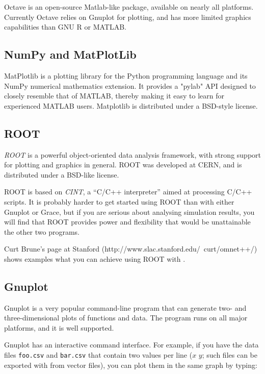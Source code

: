 Octave is an open-source Matlab-like package, available on nearly all platforms.
Currently Octave relies on Gnuplot for plotting, and has more limited
graphics capabilities than GNU R or MATLAB.

\subsection{NumPy and MatPlotLib}

MatPlotlib is a plotting library for the Python programming language and
its NumPy numerical mathematics extension. It provides a "pylab" API designed
to closely resemble that of MATLAB, thereby making it easy to learn
for experienced MATLAB users. Matplotlib is distributed under a BSD-style
license.


\subsection{ROOT}

\textit{ROOT} is a powerful object-oriented data analysis framework,
with strong support for plotting and graphics in general.
ROOT was developed at CERN, and is distributed under a BSD-like license.

ROOT is based on \textit{CINT}, a ``C/C++ interpreter''
aimed at processing C/C++ scripts. It is probably harder to get started
using ROOT than with either Gnuplot or Grace, but if you are serious
about analysing simulation results, you will find that ROOT provides
power and flexibility that would be unattainable the other two programs.

Curt Brune's page at Stanford (http://www.slac.stanford.edu/~curt/omnet++/)
shows examples what you can achieve using ROOT with {\opp}.


\subsection{Gnuplot}
\label{sec:ana-sim:gnuplot}

Gnuplot is a very popular command-line program that can generate two-
and three-dimensional plots of functions and data. The program runs
on all major platforms, and it is well supported.

Gnuplot has an interactive command interface. For example, if you have
the data files \texttt{foo.csv} and \texttt{bar.csv} that contain
two values per line ($x$ $y$; such files can be exported with
 from vector files), you can plot them in the same
graph by typing:

